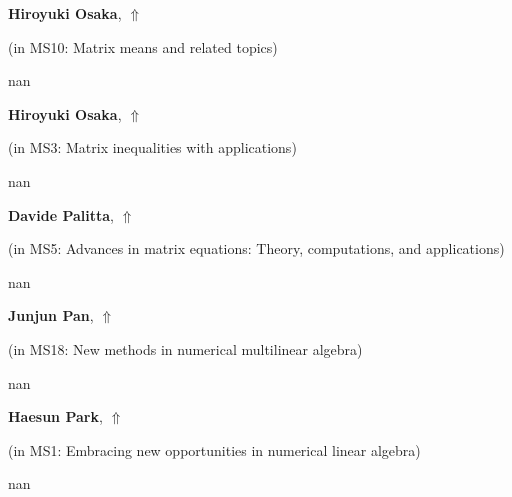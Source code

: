 \documentclass[ILAS2025-program.tex]{subfiles}
\begin{document}
     \hypertarget{down0057}{}\begin{ilasabstract}
    
    \textbf{Hiroyuki Osaka},  \hfill \hyperlink{up0057}{$\Uparrow$}
    
    (in {\color{mstitle}MS10: Matrix means and related topics})
        
        \mtskip
    nan\end{ilasabstract}
     \hypertarget{down0266}{}\begin{ilasabstract}
    
    \textbf{Hiroyuki Osaka},  \hfill \hyperlink{up0266}{$\Uparrow$}
    
    (in {\color{mstitle}MS3: Matrix inequalities with applications})
        
        \mtskip
    nan\end{ilasabstract}
     \hypertarget{down0364}{}\begin{ilasabstract}
    
    \textbf{Davide Palitta},  \hfill \hyperlink{up0364}{$\Uparrow$}
    
    (in {\color{mstitle}MS5: Advances in matrix equations: Theory, computations, and applications})
        
        \mtskip
    nan\end{ilasabstract}
     \hypertarget{down0190}{}\begin{ilasabstract}
    
    \textbf{Junjun Pan},  \hfill \hyperlink{up0190}{$\Uparrow$}
    
    (in {\color{mstitle}MS18: New methods in numerical multilinear algebra})
        
        \mtskip
    nan\end{ilasabstract}
     \hypertarget{down0305}{}\begin{ilasabstract}
    
    \textbf{Haesun Park},  \hfill \hyperlink{up0305}{$\Uparrow$}
    
    (in {\color{mstitle}MS1: Embracing new opportunities in numerical linear algebra})
        
        \mtskip
    nan\end{ilasabstract}
\end{document}
